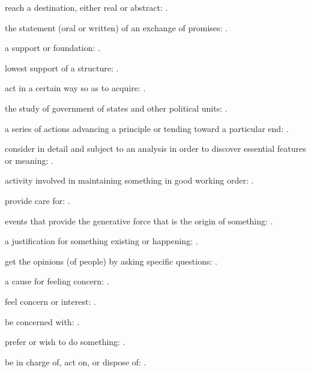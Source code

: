   reach a destination, either real or abstract:   .

  the statement (oral or written) of an exchange of promises:   .

  a support or foundation:   .

  lowest support of a structure:   .

  act in a certain way so as to acquire: .

  the study of government of states and other political units:   .

  a series of actions advancing a principle or tending toward a particular end:   .

  consider in detail and subject to an analysis in order to discover essential features or meaning:   .

  activity involved in maintaining something in good working order:   .

  provide care for:   .

  events that provide the generative force that is the origin of something: .

  a justification for something existing or happening:   .

  get the opinions (of people) by asking specific questions:   .

  a cause for feeling concern: .

  feel concern or interest: .

  be concerned with:   .

  prefer or wish to do something:   .

  be in charge of, act on, or dispose of:   .

